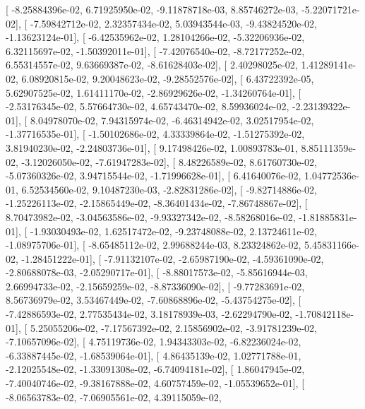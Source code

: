 \documentclass{article}
\begin{document}
       [ -8.25884396e-02,   6.71925950e-02,  -9.11878718e-03,
          8.85746272e-03,  -5.22071721e-02],
       [ -7.59842712e-02,   2.32357434e-02,   5.03943544e-03,
         -9.43824520e-02,  -1.13623124e-01],
       [ -6.42535962e-02,   1.28104266e-02,  -5.32206936e-02,
          6.32115697e-02,  -1.50392011e-01],
       [ -7.42076540e-02,  -8.72177252e-02,   6.55314557e-02,
          9.63669387e-02,  -8.61628403e-02],
       [  2.40298025e-02,   1.41289141e-02,   6.08920815e-02,
          9.20048623e-02,  -9.28552576e-02],
       [  6.43722392e-05,   5.62907525e-02,   1.61411170e-02,
         -2.86929626e-02,  -1.34260764e-01],
       [ -2.53176345e-02,   5.57664730e-02,   4.65743470e-02,
          8.59936024e-02,  -2.23139322e-01],
       [  8.04978070e-02,   7.94315974e-02,  -6.46314942e-02,
          3.02517954e-02,  -1.37716535e-01],
       [ -1.50102686e-02,   4.33339864e-02,  -1.51275392e-02,
          3.81940230e-02,  -2.24803736e-01],
       [  9.17498426e-02,   1.00893783e-01,   8.85111359e-02,
         -3.12026050e-02,  -7.61947283e-02],
       [  8.48226589e-02,   8.61760730e-02,  -5.07360326e-02,
          3.94715544e-02,  -1.71996628e-01],
       [  6.41640076e-02,   1.04772536e-01,   6.52534560e-02,
          9.10487230e-03,  -2.82831286e-02],
       [ -9.82714886e-02,  -1.25226113e-02,  -2.15865449e-02,
         -8.36401434e-02,  -7.86748867e-02],
       [  8.70473982e-02,  -3.04563586e-02,  -9.93327342e-02,
         -8.58268016e-02,  -1.81885831e-01],
       [ -1.93030493e-02,   1.62517472e-02,  -9.23748088e-02,
          2.13724611e-02,  -1.08975706e-01],
       [ -8.65485112e-02,   2.99688244e-03,   8.23324862e-02,
          5.45831166e-02,  -1.28451222e-01],
       [ -7.91132107e-02,  -2.65987190e-02,  -4.59361090e-02,
         -2.80688078e-03,  -2.05290717e-01],
       [ -8.88017573e-02,  -5.85616944e-03,   2.66994733e-02,
         -2.15659259e-02,  -8.87336090e-02],
       [ -9.77283691e-02,   8.56736979e-02,   3.53467449e-02,
         -7.60868896e-02,  -5.43754275e-02],
       [ -7.42886593e-02,   2.77535434e-02,   3.18178939e-03,
         -2.62294790e-02,  -1.70842118e-01],
       [  5.25055206e-02,  -7.17567392e-02,   2.15856902e-02,
         -3.91781239e-02,  -7.10657096e-02],
       [  4.75119736e-02,   1.94343303e-02,  -6.82236024e-02,
         -6.33887445e-02,  -1.68539064e-01],
       [  4.86435139e-02,   1.02771788e-01,  -2.12025548e-02,
         -1.33091308e-02,  -6.74094181e-02],
       [  1.86047945e-02,  -7.40040746e-02,  -9.38167888e-02,
          4.60757459e-02,  -1.05539652e-01],
       [ -8.06563783e-02,  -7.06905561e-02,   4.39115059e-02,
\end{document}
